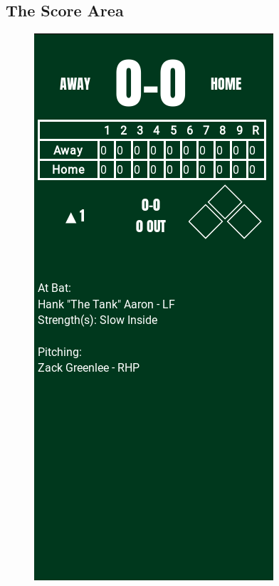 \documentclass[12pt,a4paper]{report}
\begin{document}
\subsection{The Score Area}

\begin{figure}
	\begin{center}
		\includegraphics[width=1\linewidth]{umInclude/score}
	\end{center}
\end{figure}
\end{document}
